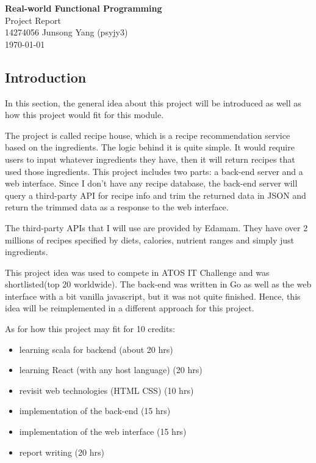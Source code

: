 \documentclass{article}
\begin{document}
\begin{center}
  \LARGE{\textbf{Real-world Functional Programming}} \\
  \Large{Project Report} \\
  \normalsize{14274056 Junsong Yang (psyjy3)} \\
  \today
\end{center}


\begin{normalsize}
  \section{Introduction}
  In this section, the general idea about this project will be introduced as
  well as how this project would fit for this module.

  The project is called recipe house, which is a recipe recommendation service based on the ingredients. The logic behind it is quite simple. It would require users to input whatever ingredients they have, then it will return recipes that used those ingredients. This project includes two parts: a back-end
  server and a web interface. Since I don't have any recipe database, the
  back-end server will query a third-party API for recipe info and trim the
  returned data in JSON and return the trimmed data as a response to the web
  interface.

  The third-party APIs that I will use are provided by Edamam. They have over 2
  millions of recipes specified by diets, calories, nutrient ranges and simply
  just ingredients.

  This project idea was used to compete in ATOS IT Challenge and was shortlisted(top 20 worldwide). The back-end was written in Go as well as the web interface with a bit vanilla javascript, but it was not quite finished.
  Hence, this idea will be reimplemented in a different approach for this
  project.

  As for how this project may fit for 10 credits:
  \begin{itemize}
  \item[]{learning scala for backend (about 20 hrs)}
  \item[]{learning React (with any host language) (20 hrs)}
  \item[]{revisit web technologies (HTML CSS) (10 hrs)}
  \item[]{implementation of the back-end (15 hrs)}
  \item[]{implementation of the web interface (15 hrs)}
  \item[]{report writing (20 hrs)}  
  \end{itemize}


\end{normalsize}
\end{document}
